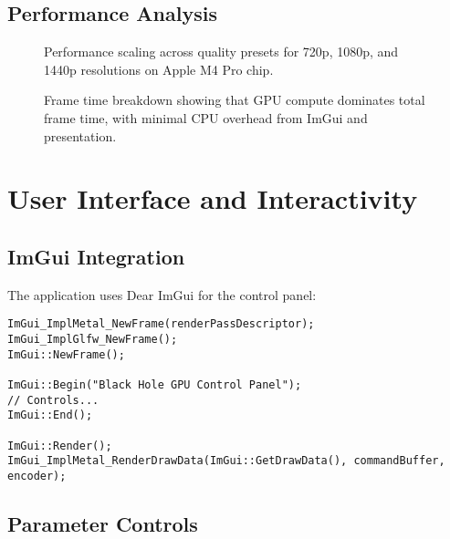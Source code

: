 \documentclass[12pt,a4paper]{article}
\theoremstyle{definition}
\theoremstyle{remark}
\begin{document}
\subsection{Performance Analysis}

\begin{figure}[H]
    \centering
    \caption{Performance scaling across quality presets for 720p, 1080p, and 1440p resolutions on Apple M4 Pro chip.}
    \label{fig:performance_scaling}
\end{figure}

\begin{figure}[H]
    \centering
    \caption{Frame time breakdown showing that GPU compute dominates total frame time, with minimal CPU overhead from ImGui and presentation.}
    \label{fig:frame_time_breakdown}
\end{figure}

\section{User Interface and Interactivity}

\subsection{ImGui Integration}

The application uses Dear ImGui for the control panel:

\begin{lstlisting}[style=metalstyle, caption=ImGui window setup]
ImGui_ImplMetal_NewFrame(renderPassDescriptor);
ImGui_ImplGlfw_NewFrame();
ImGui::NewFrame();

ImGui::Begin("Black Hole GPU Control Panel");
// Controls...
ImGui::End();

ImGui::Render();
ImGui_ImplMetal_RenderDrawData(ImGui::GetDrawData(), commandBuffer, encoder);
\end{lstlisting}

\subsection{Parameter Controls}
\end{document}
